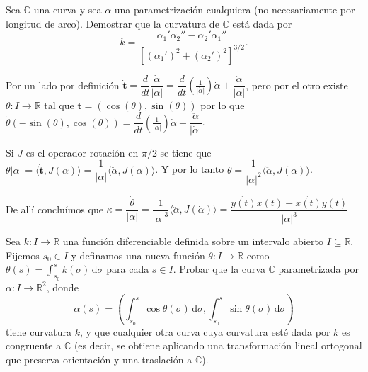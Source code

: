 \documentclass[11pt]{article}
\newcommand{\C}{\mathbb{C}}
\newcommand{\R}{{\mathbb{R}}}
\newcommand\dd{\,\mathrm{d}}
\newcommand\abs[1]{\left\lvert#1\right\rvert}
\renewcommand\tt{\mathbf{t}}
\newenvironment{proof}[1][Demostraci\'on]{\begin{trivlist}
		\item[\hskip \labelsep {\bfseries #1}]}{\end{trivlist}}
\newcommand{\qed}{\nobreak \ifvmode \relax \else
	\ifdim\lastskip<1.5em \hskip-\lastskip
	\hskip1.5em plus0em minus0.5em \fi \nobreak
	\vrule height0.75em width0.5em depth0.25em\fi}
\begin{document}
\begin{enumerate}
\begin{proof}
\begin{enumerate}
		\end{enumerate}
	\end{proof}
	
	\item Sea $\C$ una curva y sea $\alpha$ una parametrizaci\'on cualquiera (no necesariamente
	por longitud de arco). Demostrar que la curvatura de $\C$ est\'a dada por
	\[
	k =
	\frac{\alpha_1'\alpha_2''-\alpha_2'\alpha_1''}{[(\alpha_1')^2+(\alpha_2')^2]^{3/2}}.
	\]
	
	\label{Ejercicio 10}
	
	\begin{proof}
		
		Por un lado por definici\'on $\dot{\tt} = \dfrac{d}{dt}{\dfrac{\dot{\alpha}}{\abs{\dot{\alpha}}}} = \dfrac{d}{dt}(\frac{1}{\abs{\dot{\alpha}}}) \dot{\alpha} + \dfrac{\ddot{\alpha}}{\abs{\dot{\alpha}}}$, pero por el otro existe $\theta:I \rightarrow \R$ tal que $\tt = (\cos(\theta), \sin(\theta))$ por lo que $\dot{\theta} (-\sin(\theta), \cos(\theta)) = \dfrac{d}{dt}(\frac{1}{\abs{\dot{\alpha}}}) \dot{\alpha} + \dfrac{\ddot{\alpha}}{\abs{\dot{\alpha}}}$.
		
		Si $J$ es el operador rotaci\'on en $\pi/2$ se tiene que $\dot{\theta} \abs{\dot{\alpha}} = \langle \dot{\tt} , J(\dot{\alpha}) \rangle = \dfrac{1}{\abs{\dot{\alpha}}} \langle \ddot{\alpha}, J(\dot{\alpha}) \rangle$. Y por lo tanto $\dot{\theta} = \dfrac{1}{\abs{\dot{\alpha}}^2} \langle \ddot{\alpha}, J(\dot{\alpha}) \rangle$.
		
		De all\'i conclu\'imos que $\kappa = \dfrac{\dot{\theta}}{\abs{\dot{\alpha}}} = \dfrac{1}{\abs{\dot{\alpha}}^3} \langle \ddot{\alpha}, J(\dot{\alpha}) \rangle = \dfrac{\ddot{y(t)}\dot{x(t)} - \ddot{x(t)}\dot{y(t)}}{\abs{\dot{\alpha}}^3}$ \qed
		
	\end{proof}
	
	\item Sea $k:I\to\R$ una funci\'on diferenciable definida sobre un intervalo abierto
	$I\subseteq \R$. Fijemos $s_0 \in I$ y definamos una nueva funci\'on $\theta: I \to \R$
	como $\theta(s) = \int_{s_0}^s k(\sigma)\dd \sigma$ para cada $s\in I$. Probar que la curva $\C$
	parametrizada por $\alpha: I \to \R^2$, donde
	\[
	\alpha(s)=\left(\int_{s_0}^s \cos \theta (\sigma)\dd \sigma,\int_{s_0}^s \sin \theta (\sigma)\dd \sigma\right)
	\]
	tiene curvatura $k$, y que cualquier otra curva cuya curvatura est\'e dada por $k$ es
	congruente a $\C$ (es decir, se obtiene aplicando una transformaci\'on lineal ortogonal que preserva orientaci\'on y una
	traslaci\'on a $\C$).
	

\end{enumerate}
\end{document}
